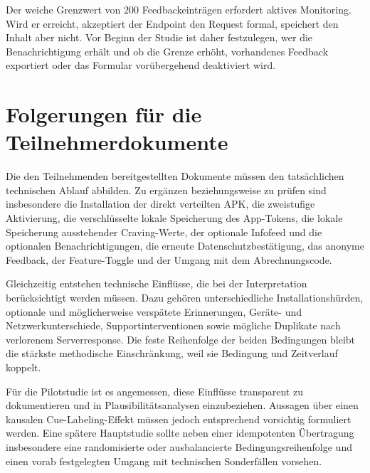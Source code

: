 Der weiche Grenzwert von 200 Feedbackeinträgen erfordert aktives Monitoring. Wird er erreicht, akzeptiert der Endpoint den Request formal, speichert den Inhalt aber nicht. Vor Beginn der Studie ist daher festzulegen, wer die Benachrichtigung erhält und ob die Grenze erhöht, vorhandenes Feedback exportiert oder das Formular vorübergehend deaktiviert wird.

\section{Folgerungen für die Teilnehmerdokumente}
Die den Teilnehmenden bereitgestellten Dokumente müssen den tatsächlichen technischen Ablauf abbilden. Zu ergänzen beziehungsweise zu prüfen sind insbesondere die Installation der direkt verteilten APK, die zweistufige Aktivierung, die verschlüsselte lokale Speicherung des App-Tokens, die lokale Speicherung ausstehender Craving-Werte, der optionale Infofeed und die optionalen Benachrichtigungen, die erneute Datenschutzbestätigung, das anonyme Feedback, der Feature-Toggle und der Umgang mit dem Abrechnungscode.

Gleichzeitig entstehen technische Einflüsse, die bei der Interpretation berücksichtigt werden müssen. Dazu gehören unterschiedliche Installationshürden, optionale und möglicherweise verspätete Erinnerungen, Geräte- und Netzwerkunterschiede, Supportinterventionen sowie mögliche Duplikate nach verlorenem Serverresponse. Die feste Reihenfolge der beiden Bedingungen bleibt die stärkste methodische Einschränkung, weil sie Bedingung und Zeitverlauf koppelt.

Für die Pilotstudie ist es angemessen, diese Einflüsse transparent zu dokumentieren und in Plausibilitätsanalysen einzubeziehen. Aussagen über einen kausalen Cue-Labeling-Effekt müssen jedoch entsprechend vorsichtig formuliert werden. Eine spätere Hauptstudie sollte neben einer idempotenten Übertragung insbesondere eine randomisierte oder ausbalancierte Bedingungsreihenfolge und einen vorab festgelegten Umgang mit technischen Sonderfällen vorsehen.
